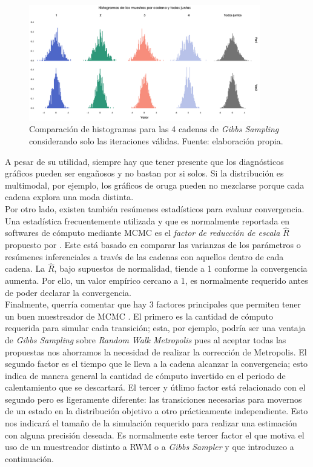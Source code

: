 \begin{figure}[h]
	\centering
	\includegraphics[width=0.9\textwidth]{Figs/Bayes/Ejemplos_Convergencia_Histogramas}
	\caption{Comparación de histogramas para las 4 cadenas de \textit{Gibbs Sampling} considerando solo las iteraciones válidas. Fuente: elaboración propia.}
	\label{fig:Conv_Hist}	
\end{figure}

A pesar de su utilidad, siempre hay que tener presente que los diagnósticos gráficos pueden ser engañosos y no bastan por si solos. Si la distribución es multimodal, por ejemplo, los gráficos de oruga pueden no mezclarse porque cada cadena explora una moda distinta.\\ 

Por otro lado, existen también resúmenes estadísticos para evaluar convergencia. Una estadística frecuentemente utilizada y que es normalmente reportada en softwares de cómputo mediante MCMC es el \textit{factor de reducción de escala} $\hat{R}$ propuesto por \textcite{GelmanRubin92}. Este está basado en comparar las varianzas de los parámetros o resúmenes inferenciales a través de las cadenas con aquellos dentro de cada cadena. La $\hat{R}$, bajo supuestos de normalidad, tiende a 1 conforme la convergencia aumenta. Por ello, un valor empírico cercano a 1, es normalmente requerido antes de poder declarar la convergencia.\\

Finalmente, querría comentar que hay 3 factores principales que permiten tener un buen muestreador de MCMC \parencite{Neal93}. El primero es la cantidad de cómputo requerida para simular cada transición; esta, por ejemplo, podría ser una ventaja de \textit{Gibbs Sampling} sobre \textit{Random Walk Metropolis} pues al aceptar todas las propuestas nos ahorramos la necesidad de realizar la corrección de Metropolis. El segundo factor es el tiempo que le lleva a la cadena alcanzar la convergencia; esto indica de manera general la cantidad de cómputo invertido en el periodo de calentamiento que se descartará. El tercer y útlimo factor está relacionado con el segundo pero es ligeramente diferente: las transiciones necesarias para movernos de un estado en la distribución objetivo a otro prácticamente independiente. Esto nos indicará el tamaño de la simulación requerido para realizar una estimación con alguna precisión deseada. Es normalmente este tercer factor el que motiva el uso de un muestreador distinto a RWM o a \textit{Gibbs Sampler} y que introduzco a continuación.

